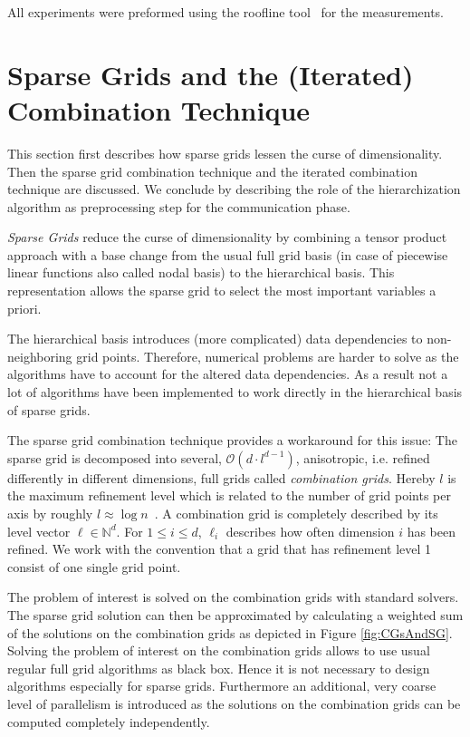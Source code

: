 \documentclass[letterpaper]{article}
\newcommand{\mypar}[1]{{\bf #1.}}
\begin{document}
			All experiments were preformed using the roofline tool~\cite{ofenbeck13applyingRoofline} for the measurements.

		\section{Sparse Grids and the (Iterated) Combination Technique}

		This section first describes how sparse grids lessen the curse of dimensionality. Then the sparse grid combination technique and the iterated combination technique are discussed. We conclude by describing the role of the hierarchization algorithm as preprocessing step for the communication phase.



		\noindent	\mypar{Sparse Grids}
			\emph{Sparse Grids} reduce the curse of dimensionality by combining a tensor product approach with a base change from the usual full grid basis (in case of piecewise linear functions also called nodal basis)  to the hierarchical basis. This representation allows the sparse grid to select the most important variables a priori.

			The hierarchical basis introduces (more complicated) data dependencies to non-neighboring grid points. Therefore, numerical problems are harder to solve as the algorithms have to account for the altered data dependencies. As a result not a lot of algorithms have been implemented to work directly in the hierarchical basis of sparse grids.


		\noindent \mypar{The Combination Technique}
			The sparse grid combination technique \cite{griebel92CombiTechnique} provides a workaround for this issue: The sparse grid is decomposed into several, $\mathcal{O}\left(d \cdot l^{d-1}\right) $, an\-isotropic, i.e. refined differently in different dimensions, full grids called \emph{combination grids}. Hereby $l$ is the maximum refinement level which is related to the number of grid points per axis by roughly $l \approx \log n\enspace$. A combination grid is completely described by its level vector $\ell \in \mathbb{N}^d$. For $1 \leq i \leq d$, $\ell_i$ describes how often dimension $i$ has been refined. We work with the convention that a grid that has refinement level 1 consist of one single grid point.

			The problem of interest is solved on the combination grids with standard solvers.
			The sparse grid solution can then be approximated by calculating a weighted sum of the solutions on the combination grids as depicted in Figure \ref{fig:CGsAndSG}.
			Solving the problem of interest on the combination grids allows to use usual regular full grid algorithms as black box.  Hence it is not necessary to design algorithms especially for sparse grids. Furthermore an additional, very coarse level of parallelism is introduced as the solutions on the combination grids can be computed completely independently.
\end{document}
